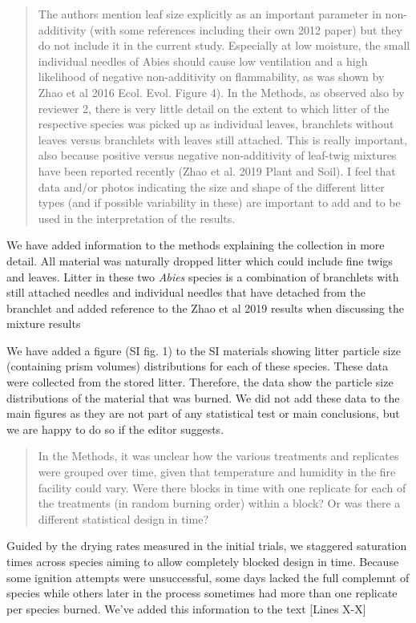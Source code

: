 \documentclass[letterpaper, 12pt]{letter}
\begin{document}
\begin{letter}{}
\begin{quote}
The authors mention leaf size explicitly as an important parameter in non-additivity (with some references including their own 2012 paper) but they do not include it in the current study. Especially at low moisture, the small individual needles of Abies should cause low ventilation and a high likelihood of negative non-additivity on flammability, as was shown by Zhao et al 2016 Ecol. Evol. Figure 4). In the Methods, as observed also by reviewer 2, there is very little detail on the extent to which litter of the respective species was picked up as individual leaves, branchlets without leaves versus branchlets with leaves still attached. This is really important, also because positive versus negative non-additivity of leaf-twig mixtures have been reported recently (Zhao et al. 2019 Plant and Soil). I feel that data and/or photos indicating the size and shape of the different litter types (and if possible variability in these) are important to add and to be used in the interpretation of the results.
\end{quote}

We have added information to the methods explaining the collection in more detail. All material was naturally dropped litter which could include fine twigs and leaves. Litter in these two \emph{Abies} species is a combination of branchlets with still attached needles and individual needles that have detached from the branchlet and added reference to the Zhao et al 2019 results when discussing the mixture results

We have added a figure (SI fig. 1) to the SI materials showing litter particle size (containing prism volumes) distributions for each of these species. These data were collected from the stored litter. Therefore, the data show the particle size distributions of the material that was burned. We did not add these data to the main figures as they are not part of any statistical test or main conclusions, but we are happy to do so if the editor suggests.


\begin{quote}
In the Methods, it was unclear how the various treatments and replicates were grouped over time, given that temperature and humidity in the fire facility could vary. Were there blocks in time with one replicate for each of the treatments (in random burning order) within a block? Or was there a different statistical design in time? 
\end{quote}

Guided by the drying rates measured in the initial trials, we staggered saturation times across species aiming to allow completely blocked design in time. Because some ignition attempts were unsuccessful, some days lacked the full complemnt of species while others later in the process sometimes had more than one replicate per species burned. We've added this information to the text [Lines X-X]


\end{letter}
\end{document}
